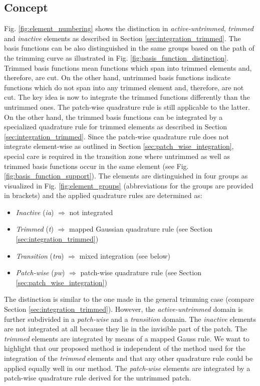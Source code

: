 \documentclass[3p]{elsarticle}
\begin{document}
\subsection{Concept} \label{sec:concept}
Fig. \ref{fig:element_numbering} shows the distinction in \textit{active-untrimmed}, \textit{trimmed} and \textit{inactive} elements as described in Section \ref{sec:integration_trimmed}. The basis functions can be also distinguished in the same groups based on the path of the trimming curve as illustrated in Fig. \ref{fig:basis_function_distinction}. Trimmed basis functions mean functions which span into trimmed elements and, therefore, are cut. On the other hand, untrimmed basis functions indicate functions which do not span into any trimmed element and, therefore, are not cut. The key idea is now to integrate the trimmed functions differently than the untrimmed ones. The patch-wise quadrature rule is still applicable to the latter. On the other hand, the trimmed basis functions can be integrated by a specialized quadrature rule for trimmed elements as described in Section \ref{sec:integration_trimmed}. Since the patch-wise quadrature rule does not integrate element-wise as outlined in Section \ref{sec:patch_wise_integration}, special care is required in the transition zone where untrimmed as well as trimmed basis functions occur in the same element (see Fig. \ref{fig:basis_function_support}). The elements are distinguished in four groups as visualized in Fig. \ref{fig:element_groups} (abbreviations for the groups are provided in brackets) and the applied quadrature rules are determined as:
\begin{itemize}
	\item \textit{Inactive} (\textit{ia}) $\Longrightarrow$ not integrated
	\item \textit{Trimmed} (\textit{t}) $\Longrightarrow$ mapped Gaussian quadrature rule (see Section \ref{sec:integration_trimmed})
	\item \textit{Transition} (\textit{tra}) $\Longrightarrow$ mixed integration (see below)
	\item \textit{Patch-wise} (\textit{pw}) $\Longrightarrow$ patch-wise quadrature rule (see Section \ref{sec:patch_wise_integration})
\end{itemize}

The distinction is similar to the one made in the general trimming case (compare Section \ref{sec:integration_trimmed}). However, the \textit{active-untrimmed} domain is further subdivided in a \textit{patch-wise} and a \textit{transition} domain. The \textit{inactive} elements are not integrated at all because they lie in the invisible part of the patch. The \textit{trimmed} elements are integrated by means of a mapped Gauss rule. We want to highlight that our proposed method is independent of the method used for the integration of the \textit{trimmed} elements and that any other quadrature rule could be applied equally well in our method. The \textit{patch-wise} elements are integrated by a patch-wise quadrature rule derived for the untrimmed patch. \bigskip 
\end{document}

